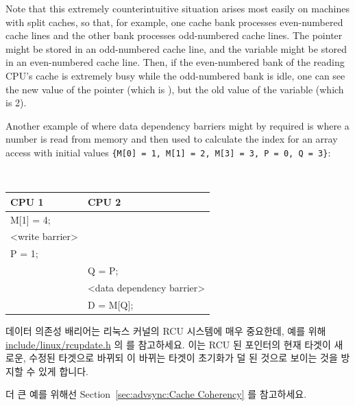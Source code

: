\begin{enumerate}
Note that this extremely counterintuitive situation arises most easily on
machines with split caches, so that, for example, one cache bank processes
even-numbered cache lines and the other bank processes odd-numbered cache
lines.
The pointer  might be stored in an odd-numbered cache line, and the
variable  might be stored in an even-numbered cache line.  Then, if the
even-numbered bank of the reading CPU's cache is extremely busy while the
odd-numbered bank is idle, one can see the new value of the
pointer  (which is ),
but the old value of the variable  (which is 2).

Another example of where data dependency barriers might by required is where a
number is read from memory and then used to calculate the index for an array
access with initial values
{\tt \{M[0] = 1, M[1] = 2, M[3] = 3, P = 0, Q = 3\}}:
\fi

\vspace{5pt}
\begin{minipage}[t]{\columnwidth}
\tt
\scriptsize
\begin{tabular}{l|p{1.5in}}
	CPU 1 &		CPU 2 \\
	\hline
	M[1] = 4; & \\
	<write barrier> & \\
	P = 1;	&	\\
		&	Q = P; \\
		&	<data dependency barrier> \\
		&	D = M[Q]; \\
\end{tabular}
\end{minipage}
\vspace{5pt}

데이터 의존성 배리어는 리눅스 커널의 RCU 시스템에 매우 중요한데, 예를 위해
\url{include/linux/rcupdate.h} 의  를 참고하세요.
이는 RCU 된 포인터의 현재 타겟이 새로운, 수정된 타겟으로 바뀌되 이 바뀌는
타겟이 초기화가 덜 된 것으로 보이는 것을 방지할 수 있게 합니다.

더 큰 예를 위해선 Section~\ref{sec:advsync:Cache Coherency} 를 참고하세요.

\end{enumerate}
